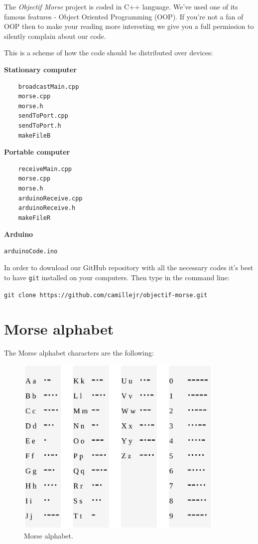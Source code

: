 \documentclass[10pt]{report}
\begin{document}
The \textit{Objectif Morse} project is coded in C++ language. We've used one of its famous features - Object Oriented Programming (OOP). If you're not a fan of OOP then to make your reading more interesting we give you a full permission to silently complain about our code.

This is a scheme of how the code should be distributed over devices:

\textbf{Stationary computer}

\begin{verbatim}
	broadcastMain.cpp
	morse.cpp
	morse.h
	sendToPort.cpp
	sendToPort.h
	makeFileB
\end{verbatim}

\textbf{Portable computer}

\begin{verbatim}
	receiveMain.cpp
	morse.cpp
	morse.h
	arduinoReceive.cpp
	arduinoReceive.h
	makeFileR
\end{verbatim}

\textbf{Arduino}

\begin{verbatim}
arduinoCode.ino
\end{verbatim}

In order to download our GitHub repository with all the necessary codes it's best to have \verb|git| installed on your computers. Then type in the command line:

\begin{snugshade}
\verb|git clone https://github.com/camillejr/objectif-morse.git|
\end{snugshade}

\newpage

\section{Morse alphabet}  \label{sec:morse}

The Morse alphabet characters are the following:

\begin{figure}[H]
\centering\includegraphics[width=10cm]{morse_alphabet}
\caption{Morse alphabet.}			
\label{fig:morse_alphabet}
\end{figure}
\end{document}
